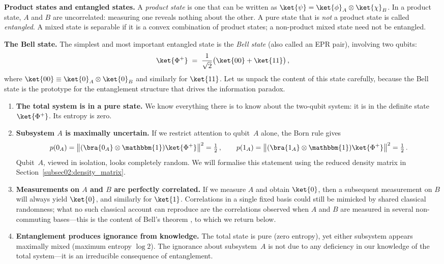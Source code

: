 \documentclass[11pt,letterpaper]{article}
\theoremstyle{plain}
\theoremstyle{definition}
\theoremstyle{remark}
\newcommand{\ind}{\mathbbm{1}}
\begin{document}
\medskip
\noindent\textbf{Product states and entangled states.}
A \emph{product state} is one that can be written as $\ket{\psi} = \ket{\phi}_A
\otimes \ket{\chi}_B$.  In a product state, $A$ and $B$ are uncorrelated:
measuring one reveals nothing about the other.  A pure state that is \emph{not} a
product state is called \emph{entangled}. A mixed state is separable if it
is a convex combination of product states; a non-product mixed state need
not be entangled.

\medskip
\noindent\textbf{The Bell state.}
The simplest and most important entangled state is the \emph{Bell state} (also called
an EPR pair), involving two qubits:
\begin{equation}\label{eq02:bell_state}
  \ket{\Phi^+} \;=\; \frac{1}{\sqrt{2}}\bigl(\ket{00} + \ket{11}\bigr)\,,
\end{equation}
where $\ket{00}\equiv\ket{0}_A\otimes\ket{0}_B$ and similarly for $\ket{11}$.
Let us unpack the content of this state carefully, because the Bell state is the
prototype for the entanglement structure that drives the information paradox.

\begin{enumerate}[label=(\roman*),itemsep=2pt]
\item \textbf{The total system is in a pure state.}  We know everything there is to
know about the two-qubit system: it is in the definite state $\ket{\Phi^+}$.  Its
entropy is zero.

\item \textbf{Subsystem $A$ is maximally uncertain.}  If we restrict attention to
qubit~$A$ alone, the Born rule gives
\[
  p(0_A) = \bigl\|(\bra{0_A}\otimes\ind)\ket{\Phi^+}\bigr\|^2 = \tfrac{1}{2}\,,
  \qquad
  p(1_A) = \bigl\|(\bra{1_A}\otimes\ind)\ket{\Phi^+}\bigr\|^2 = \tfrac{1}{2}\,.
\]
Qubit~$A$, viewed in isolation, looks completely random.  We will formalise this
statement using the reduced density matrix in Section~\ref{subsec02:density_matrix}.

\item \textbf{Measurements on $A$ and $B$ are perfectly correlated.}  If we measure
$A$ and obtain $\ket{0}$, then a subsequent measurement on $B$ will always yield
$\ket{0}$, and similarly for $\ket{1}$.  Correlations in a single fixed basis could
still be mimicked by shared classical randomness; what no such classical account can
reproduce are the correlations observed when $A$ and $B$ are measured in several
non-commuting bases---this is the content of Bell's theorem \cite{bell1964}, to
which we return below.

\item \textbf{Entanglement produces ignorance from knowledge.}  The total state is pure
(zero entropy), yet either subsystem appears maximally mixed (maximum entropy $\log 2$).
The ignorance about subsystem~$A$ is not due to any deficiency in our knowledge
of the total system---it is an irreducible consequence of entanglement.
\end{enumerate}
\end{document}

